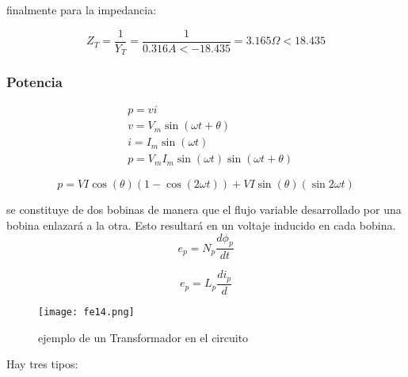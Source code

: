 finalmente para la impedancia:

\begin{equation*}
	Z_T=\frac{1}{Y_T}=\frac{1}{0.316A<-18.435}=3.165\Omega <18.435
\end{equation*}

\begin{problem}

\end{problem}

\subsubsection{Potencia}


\begin{align*}
	 & p=vi                                        \\
	 & v=V_m\sin(\omega t +\theta)                 \\
	 & i=I_m\sin(\omega t)                         \\
	 & p=V_mI_m\sin(\omega t)\sin(\omega t+\theta)
\end{align*}

\begin{equation}
	p=VI\cos(\theta)\left(1-\cos(2\omega t)\right)+VI\sin(\theta)\left(\sin2\omega t\right)
\end{equation}


\begin{definition}[Transformador]
	se constituye de dos bobinas de manera que el flujo variable desarrollado por una bobina enlazará a la otra. Esto resultará en un voltaje inducido en cada bobina.
	\begin{equation}
		e_p=N_p \frac{d\phi_p}{dt}
	\end{equation}

	\begin{equation}
		e_p=L_p \frac{di_p}{d}
	\end{equation}

\end{definition}

\begin{figure}[h!]
	\centerline{\texttt{[image: fe14.png]}}
	\caption{ejemplo de un Transformador en el circuito}
	\label{fe14}
\end{figure}

Hay tres tipos:

